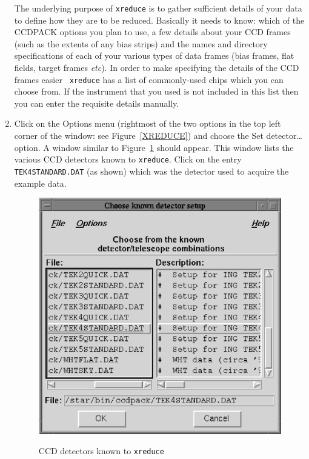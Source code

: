 \documentclass[twoside,11pt]{article}
\begin{document}
\begin{enumerate}
   The underlying purpose of {\tt xreduce} is to gather sufficient details
   of your data to define how they are to be reduced.  Basically it needs
   to know: which of the CCDPACK options you plan to use, a few details
   about your CCD frames (such as the extents of any bias strips) and the
   names and directory specifications of each of your various types of
   data frames (bias frames, flat fields, target frames \emph{etc}).  In
   order to make specifying the details of the CCD frames easier {\tt
   xreduce} has a list of commonly-used chips which you can choose from.
   If the instrument that you used is not included in this list then you
   can enter the requisite details manually.
   
  \item Click on the {\sf Options} menu (rightmost of the two options in
   the top left corner of the window: see Figure~\ref{XREDUCE}) and
   choose the {\sf Set detector\ldots} option.  A window similar to
   Figure~\ref{SETDETECTOR} should appear.  This window lists the various
   CCD detectors known to {\tt xreduce}.  Click on the entry {\tt
   TEK4STANDARD.DAT} (as shown) which was the detector used to acquire the
   example data.

  \begin{figure}[htbp]
     \centering 
      \includegraphics[totalheight=3in]{sc5_setdetector.ps}
      \begin{quote}
      \caption{CCD detectors known to {\tt xreduce}
      \label{SETDETECTOR} }
      \end{quote}
  \end{figure}


\end{enumerate}
\end{document}
